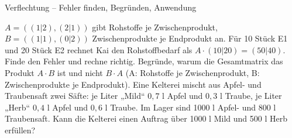 \begin{aufgabe}{Verflechtung – Fehler finden, Begründen, Anwendung}
\begin{teile}
\teil $A = ((1 | 2), (2 | 1))$ gibt Rohstoffe je Zwischenprodukt, $B = ((1 | 1), (0 | 2))$ Zwischenprodukte je Endprodukt an. Für 10 Stück E1 und 20 Stück E2 rechnet Kai den Rohstoffbedarf als $A \cdot (10 | 20) = (50 | 40)$. Finde den Fehler und rechne richtig.
\teil Begründe, warum die Gesamtmatrix das Produkt $A \cdot B$ ist und nicht $B \cdot A$ (A: Rohstoffe je Zwischenprodukt, B: Zwischenprodukte je Endprodukt).
\teil Eine Kelterei mischt aus Apfel- und Traubensaft zwei Säfte: je Liter „Mild“ $0{,}7$ l Apfel und $0{,}3$ l Traube, je Liter „Herb“ $0{,}4$ l Apfel und $0{,}6$ l Traube. Im Lager sind 1000 l Apfel- und 800 l Traubensaft. Kann die Kelterei einen Auftrag über 1000 l Mild und 500 l Herb erfüllen?
\end{teile}
\end{aufgabe}
